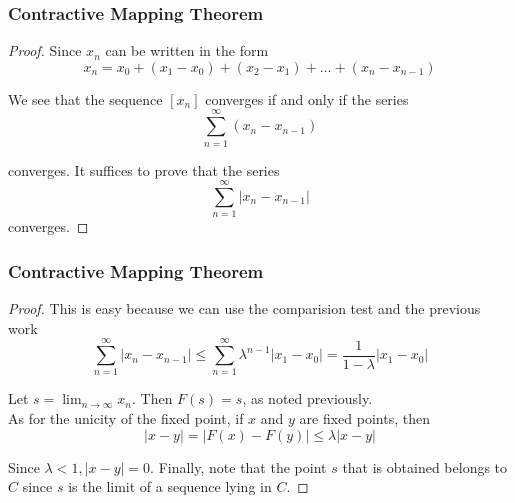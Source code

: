 \documentclass[notheorems,mathserif,table,compress]{beamer}  %
\begin{document}
\begin{frame}
\frametitle{Contractive Mapping Theorem}
\begin{proof}
Since $x_n$ can be written in the form
\begin{displaymath}
x_n=x_0+(x_1-x_0)+(x_2-x_1)+\ldots+(x_n-x_{n-1})
\end{displaymath}

We see that the sequence $[x_n]$ converges if and only if the series
\begin{displaymath}
\sum_{n=1}^{\infty}(x_n-x_{n-1})
\end{displaymath}

converges. It suffices to prove that the series
\begin{displaymath}
\sum_{n=1}^{\infty}|x_n-x_{n-1}|
\end{displaymath}
converges. 
\end{proof}
\end{frame}

\begin{frame}
\frametitle{Contractive Mapping Theorem}
\begin{proof}
This is easy because we can use the comparision test and the previous work
\begin{displaymath}
\sum_{n=1}^{\infty}|x_n-x_{n-1}|\leq\sum_{n=1}^{\infty}\lambda ^{n-1}|x_1-x_0|=\frac{1}{1-\lambda}|x_1-x_0|
\end{displaymath}

Let $s=\lim_{n\to \infty}x_n$. Then $F(s)=s$, as noted previously. \\
As for the unicity of the fixed point, if $x$ and $y$ are fixed points, then 
\begin{displaymath}
|x-y|=|F(x)-F(y)|\leq\lambda|x-y|
\end{displaymath}

Since $\lambda<1,|x-y|=0$. Finally, note that the point $s$ that is obtained belongs to $C$ since $s$ is the limit of a sequence lying in $C$.
\end{proof}
\end{frame}
\end{document}
